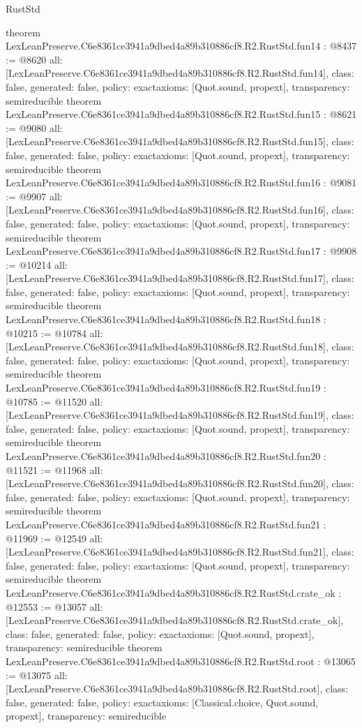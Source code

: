 \begin{lexlean}{RustStd}
\begin{coremodule}
{}
theorem LexLeanPreserve.C6e8361ce3941a9dbed4a89b310886cf8.R2.RustStd.fun14 : @8437 := @8620 {
  all: [LexLeanPreserve.C6e8361ce3941a9dbed4a89b310886cf8.R2.RustStd.fun14],
  class: false,
  generated: false,
  policy: exact{axioms: [Quot.sound, propext]},
  transparency: semireducible
}
theorem LexLeanPreserve.C6e8361ce3941a9dbed4a89b310886cf8.R2.RustStd.fun15 : @8621 := @9080 {
  all: [LexLeanPreserve.C6e8361ce3941a9dbed4a89b310886cf8.R2.RustStd.fun15],
  class: false,
  generated: false,
  policy: exact{axioms: [Quot.sound, propext]},
  transparency: semireducible
}
theorem LexLeanPreserve.C6e8361ce3941a9dbed4a89b310886cf8.R2.RustStd.fun16 : @9081 := @9907 {
  all: [LexLeanPreserve.C6e8361ce3941a9dbed4a89b310886cf8.R2.RustStd.fun16],
  class: false,
  generated: false,
  policy: exact{axioms: [Quot.sound, propext]},
  transparency: semireducible
}
theorem LexLeanPreserve.C6e8361ce3941a9dbed4a89b310886cf8.R2.RustStd.fun17 : @9908 := @10214 {
  all: [LexLeanPreserve.C6e8361ce3941a9dbed4a89b310886cf8.R2.RustStd.fun17],
  class: false,
  generated: false,
  policy: exact{axioms: [Quot.sound, propext]},
  transparency: semireducible
}
theorem LexLeanPreserve.C6e8361ce3941a9dbed4a89b310886cf8.R2.RustStd.fun18 : @10215 := @10784 {
  all: [LexLeanPreserve.C6e8361ce3941a9dbed4a89b310886cf8.R2.RustStd.fun18],
  class: false,
  generated: false,
  policy: exact{axioms: [Quot.sound, propext]},
  transparency: semireducible
}
theorem LexLeanPreserve.C6e8361ce3941a9dbed4a89b310886cf8.R2.RustStd.fun19 : @10785 := @11520 {
  all: [LexLeanPreserve.C6e8361ce3941a9dbed4a89b310886cf8.R2.RustStd.fun19],
  class: false,
  generated: false,
  policy: exact{axioms: [Quot.sound, propext]},
  transparency: semireducible
}
theorem LexLeanPreserve.C6e8361ce3941a9dbed4a89b310886cf8.R2.RustStd.fun20 : @11521 := @11968 {
  all: [LexLeanPreserve.C6e8361ce3941a9dbed4a89b310886cf8.R2.RustStd.fun20],
  class: false,
  generated: false,
  policy: exact{axioms: [Quot.sound, propext]},
  transparency: semireducible
}
theorem LexLeanPreserve.C6e8361ce3941a9dbed4a89b310886cf8.R2.RustStd.fun21 : @11969 := @12549 {
  all: [LexLeanPreserve.C6e8361ce3941a9dbed4a89b310886cf8.R2.RustStd.fun21],
  class: false,
  generated: false,
  policy: exact{axioms: [Quot.sound, propext]},
  transparency: semireducible
}
theorem LexLeanPreserve.C6e8361ce3941a9dbed4a89b310886cf8.R2.RustStd.crate_ok : @12553 := @13057 {
  all: [LexLeanPreserve.C6e8361ce3941a9dbed4a89b310886cf8.R2.RustStd.crate_ok],
  class: false,
  generated: false,
  policy: exact{axioms: [Quot.sound, propext]},
  transparency: semireducible
}
theorem LexLeanPreserve.C6e8361ce3941a9dbed4a89b310886cf8.R2.RustStd.root : @13065 := @13075 {
  all: [LexLeanPreserve.C6e8361ce3941a9dbed4a89b310886cf8.R2.RustStd.root],
  class: false,
  generated: false,
  policy: exact{axioms: [Classical.choice, Quot.sound, propext]},
  transparency: semireducible
}


\end{coremodule}
\end{lexlean}
